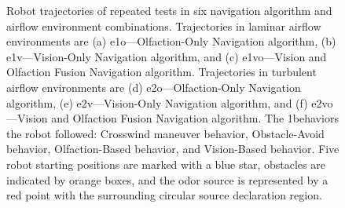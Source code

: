 \begin{figure}[h!]
\begin{center}
\end{center}
\vspace{-.1in}

\caption
{Robot trajectories of repeated tests in six navigation algorithm and airflow environment combinations. Trajectories in laminar airflow environments are (a) e1o—Olfaction-Only Navigation algorithm, (b) e1v—Vision-Only Navigation algorithm, and (c) e1vo—Vision and Olfaction Fusion Navigation algorithm. Trajectories in turbulent airflow environments are (d) e2o—Olfaction-Only Navigation algorithm, (e) e2v—Vision-Only Navigation algorithm, and (f) e2vo—Vision and Olfaction Fusion Navigation algorithm. The 1behaviors the robot followed: Crosswind maneuver behavior, Obstacle-Avoid behavior, Olfaction-Based behavior, and Vision-Based behavior. Five robot starting positions are marked with a blue star, obstacles are indicated by orange boxes, and the odor source is represented by a red point with the surrounding circular source declaration region.}
\label{fig:combinedTrajectories}
\end{figure}

